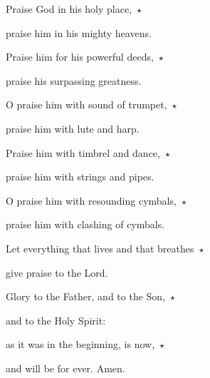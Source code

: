 \noindent Praise God in his holy place,~$\star$~\nopagebreak

praise him in his mighty heavens.

\noindent Praise him for his powerful deeds,~$\star$~\nopagebreak

praise his surpassing greatness.

\noindent O praise him with sound of trumpet,~$\star$~\nopagebreak

praise him with lute and harp.

\noindent Praise him with timbrel and dance,~$\star$~\nopagebreak

praise him with strings and pipes.

\noindent O praise him with resounding cymbals,~$\star$~\nopagebreak

praise him with clashing of cymbals.

\noindent Let everything that lives and that breathes~$\star$~\nopagebreak

give praise to the Lord.

\noindent Glory to the Father, and to the Son,~$\star$~\nopagebreak

and to the Holy Spirit:

\noindent as it was in the beginning, is now,~$\star$~\nopagebreak

and will be for ever. Amen.